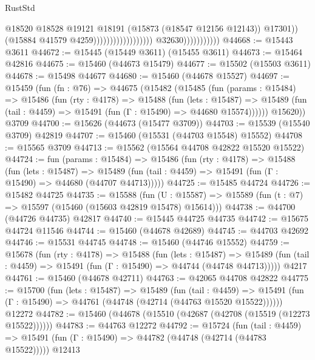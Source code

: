 \begin{lexlean}{RustStd}
\begin{coremodule}
                                                                @18520
                                                                @18528
                                                                @19121
                                                                @18191
                                                                (@15873 (@18547 @12156 @12143))
                                                                @17301))
                                                            (@15884 @41579 @4259))))))))))))))))))
                          @32630)))))))))))
@44668 := @15443 @3611
@44672 := @15445 (@15449 @3611) (@15455 @3611)
@44673 := @15464 @42816
@44675 := @15460 (@44673 @15479)
@44677 := @15502 (@15503 @3611)
@44678 := @15498 @44677
@44680 := @15460 (@44678 @15527)
@44697 := @15459
    (fun (fn : @76) =>
    @44675
      (@15482
        (@15485
          (fun (params : @15484) =>
          @15486
            (fun (rty : @4178) =>
            @15488
              (fun (lets : @15487) =>
              @15489 (fun (tail : @4459) => @15491 (fun (Γ : @15490) => @44680 @15574))))))
        @15620))
    @3709
@44700 := @15626 (@44673 (@15477 @3709))
@44703 := @15539 (@15540 @3709) @42819
@44707 := @15460 (@15531 (@44703 @15548) @15552)
@44708 := @15565 @3709
@44713 := @15562 (@15564 @44708 @42822 @15520 @15522)
@44724 := fun (params : @15484) =>
  @15486
    (fun (rty : @4178) =>
    @15488
      (fun (lets : @15487) =>
      @15489 (fun (tail : @4459) => @15491 (fun (Γ : @15490) => @44680 (@44707 @44713)))))
@44725 := @15485 @44724
@44726 := @15482 @44725
@44735 := @15588
    (fun (U : @15587) => @15589 (fun (t : @7) => @15597 (@15460 (@15603 @42819 @15478) @15614)))
@44738 := @44700 (@44726 @44735) @42817
@44740 := @15445 @44725 @44735
@44742 := @15675 @44724 @11546
@44744 := @15460 (@44678 @42689)
@44745 := @44703 @42692
@44746 := @15531 @44745
@44748 := @15460 (@44746 @15552)
@44759 := @15678
    (fun (rty : @4178) =>
    @15488
      (fun (lets : @15487) =>
      @15489 (fun (tail : @4459) => @15491 (fun (Γ : @15490) => @44744 (@44748 @44713)))))
    @4217
@44761 := @15460 (@44678 @42711)
@44763 := @42065 @44708 @42822
@44775 := @15700
    (fun (lets : @15487) =>
    @15489
      (fun (tail : @4459) =>
      @15491 (fun (Γ : @15490) => @44761 (@44748 (@42714 (@44763 @15520 @15522))))))
    @12272
@44782 := @15460 (@44678 (@15510 (@42687 (@42708 (@15519 (@12273 @15522))))))
@44783 := @44763 @12272
@44792 := @15724
    (fun (tail : @4459) => @15491 (fun (Γ : @15490) => @44782 (@44748 (@42714 (@44783 @15522)))))
    @12413

\end{coremodule}
\end{lexlean}
